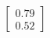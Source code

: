 \documentclass[preview]{standalone}
\begin{document}
\begin{align*}
\begin{bmatrix} 0.79 \\ 0.52 \end{bmatrix}
\end{align*}
\end{document}
